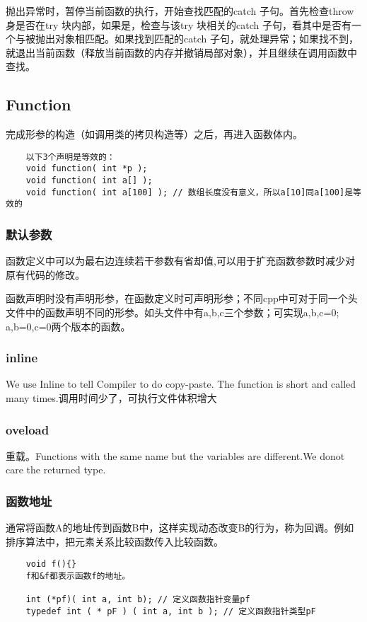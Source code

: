 \documentclass[UTF8]{../computerUniverse}
\begin{document}
抛出异常时，暂停当前函数的执行，开始查找匹配的catch 子句。首先检查throw 身是否在try 块内部，如果是，检查与该try 块相关的catch 子句，看其中是否有一个与被抛出对象相匹配。如果找到匹配的catch 子句，就处理异常；如果找不到，就退出当前函数（释放当前函数的内存并撤销局部对象），并且继续在调用函数中查找。





\subsection{Function}

完成形参的构造（如调用类的拷贝构造等）之后，再进入函数体内。
\begin{lstlisting}
    以下3个声明是等效的：
    void function( int *p );
    void function( int a[] );
    void function( int a[100] ); // 数组长度没有意义，所以a[10]同a[100]是等效的
\end{lstlisting}

\subsubsection{默认参数}

函数定义中可以为最右边连续若干参数有省却值,可以用于扩充函数参数时减少对原有代码的修改。

函数声明时没有声明形参，在函数定义时可声明形参；不同cpp中可对于同一个头文件中的函数声明不同的形参。如头文件中有a,b,c三个参数；可实现a,b,c=0; a,b=0,c=0两个版本的函数。


\subsubsection{inline}
We use Inline to tell Compiler to do copy-paste. The function is short and called many times.调用时间少了，可执行文件体积增大


\subsubsection{oveload}
重载。Functions with the same name but the variables are different.We donot care the returned type.


\subsubsection{函数地址}
通常将函数A的地址传到函数B中，这样实现动态改变B的行为，称为回调。例如排序算法中，把元素关系比较函数传入比较函数。
\begin{lstlisting}
    void f(){}
    f和&f都表示函数f的地址。

    int (*pf)( int a, int b); // 定义函数指针变量pf
    typedef int ( * pF ) ( int a, int b ); // 定义函数指针类型pF

    
\end{lstlisting}
\end{document}
